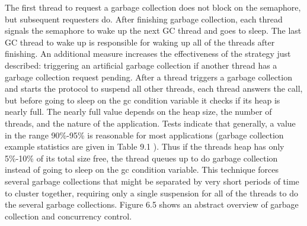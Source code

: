 The first thread to request a garbage collection does not block on the semaphore, but subsequent
requesters do. After finishing garbage collection, each thread signals the semaphore to wake up
the next GC thread and goes to sleep. The last GC thread to wake up is responsible for waking up
all of the threads after finishing.
An additional measure increases the effectiveness of the strategy just described: triggering an
artificial garbage collection if another thread has a garbage collection request pending. After
a thread triggers a garbage collection and starts the protocol to suspend all other threads,
each thread answers the call, but before going to sleep on the gc condition variable it checks
if its heap is nearly full. The nearly full value depends on the heap size, the number of
threads, and the nature of the application. Tests indicate that generally, a value in the range
90\%-95\% is reasonable for most applications (garbage collection example statistics are given
in Table 9.1 ). Thus if the threads heap has only 5\%-10\% of its total size free, the thread
queues up to do garbage collection instead of going to sleep on the gc condition variable.
This technique forces several garbage collections that might be separated by very short periods
of time to cluster together, requiring only a single suspension for all of the threads to do the
several garbage collections. Figure 6.5 shows an abstract overview of garbage collection and
concurrency control.

